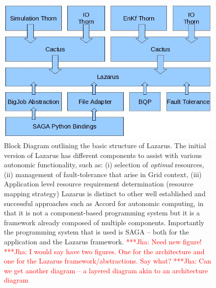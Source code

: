 \documentclass[conference,final]{IEEEtran}
\newcommand{\jhanote}[1]{ {\textcolor{red} { ***Jha: #1 }}}
\begin{document}
\begin{figure}
\begin{center}
\includegraphics[scale=0.34]{./figures/Figure2.jpeg}
\end{center}

\caption{Block Diagram outlining the basic structure of Lazarus. The
  initial version of Lazarus has different components to assist with
  various autonomic functionality, such as: (i) selection of {\it
    optimal} resources, (ii) management of fault-tolerance that arise
  in Grid context, (iii) Application level resource requirement
  determination (resource mapping strategy) Lazarus is distinct to
  other well established and successful approaches such as Accord for
  autonomic computing, in that it is not a component-based programming
  system but it is a framework already composed of multiple
  components. Importantly the programming system that is used is SAGA
  -- both for the application and the Lazarus framework.
  \jhanote{Need new figure!}  \jhanote{I would say have two
    figures. One for the architecture and one for the Lazarus
    framework/abstractions. Say what?}  \jhanote{Can we get another
    diagram -- a layered diagram akin to an architecture diagram}}
\label{fig:application_architecture}
\end{figure}
\end{document}
